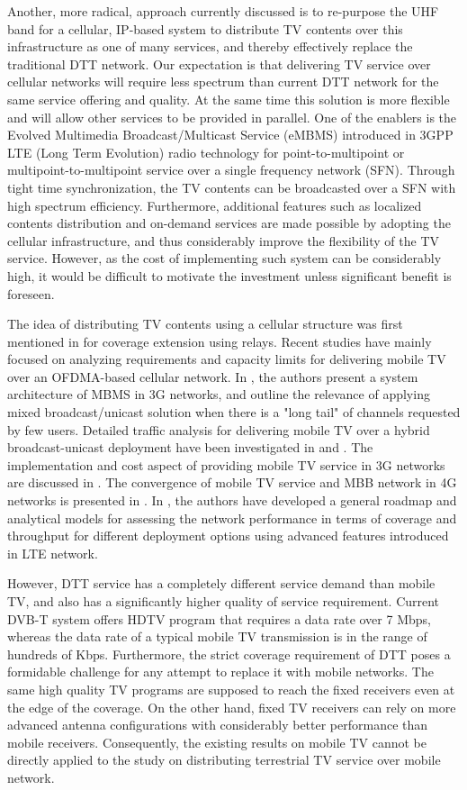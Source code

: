 \documentclass[journal]{IEEEtran}
\begin{document}
Another, more radical, approach currently discussed is to re-purpose the UHF band for a cellular, IP-based system to distribute TV contents over this infrastructure as one of many services, and thereby effectively replace the traditional DTT network. Our expectation is that delivering TV service over cellular networks will require less spectrum than current DTT network for the same service offering and quality. At the same time this solution is more flexible and will allow other services to be provided in parallel. One of the enablers is the Evolved Multimedia Broadcast/Multicast Service (eMBMS) introduced in 3GPP LTE (Long Term Evolution) radio technology for point-to-multipoint or multipoint-to-multipoint service over a single frequency network (SFN)\cite{3GPP}. Through tight time synchronization, the TV contents can be broadcasted over a SFN with high spectrum efficiency. Furthermore, additional features such as localized contents distribution and on-demand services are made possible by adopting the cellular infrastructure, and thus considerably improve the flexibility of the TV service. However, as the cost of implementing such system can be considerably high, it would be difficult to motivate the investment unless significant benefit is foreseen. 

The idea of distributing TV contents using a cellular structure was first mentioned in \cite{lery} for coverage extension using relays. Recent studies have mainly focused on analyzing requirements and capacity limits for delivering mobile TV over an OFDMA-based cellular network. In \cite{Hartung}, the authors  present a system architecture of MBMS in 3G networks, and outline the relevance of applying mixed broadcast/unicast solution when there is a "long tail" of channels requested by few users. Detailed traffic analysis for delivering mobile TV over a hybrid broadcast-unicast deployment have been investigated in \cite{Caterin} and \cite{Lohmar}. The implementation and cost aspect of providing mobile TV service in 3G networks are discussed in \cite{Aurelian_IEEENET}. The convergence of mobile TV service and MBB network in 4G networks is presented in \cite{Jorg_conf11}. In \cite{Rong11}, the authors have developed a general roadmap and analytical models for assessing the network performance in terms of coverage and throughput for different deployment options using advanced features introduced in LTE network.

However, DTT service has a completely different service demand than mobile TV, and also has a significantly higher quality of service requirement. Current DVB-T system offers HDTV program that requires a data rate over 7 Mbps, whereas the data rate of a typical mobile TV transmission is in the range of hundreds of Kbps. Furthermore, the strict coverage requirement of DTT poses a formidable challenge for any attempt to replace it with mobile networks. The same high quality TV programs are supposed to reach the fixed receivers even at the edge of the coverage. On the other hand, fixed TV receivers can rely on more advanced antenna configurations with considerably better performance than mobile receivers. Consequently, the existing results on mobile TV cannot be directly applied to the study on distributing terrestrial TV service over mobile network.
\end{document}
